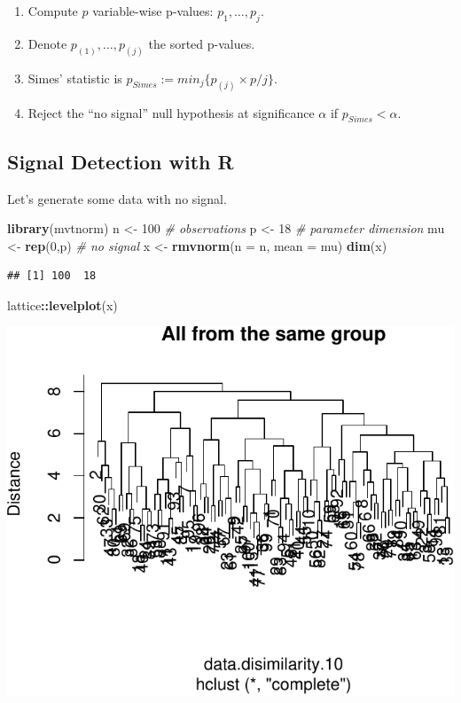 \documentclass[]{book}
\newenvironment{Shaded}{\begin{snugshade}}{\end{snugshade}}
\newcommand{\KeywordTok}[1]{\textcolor[rgb]{0.13,0.29,0.53}{\textbf{#1}}}
\newcommand{\DataTypeTok}[1]{\textcolor[rgb]{0.13,0.29,0.53}{#1}}
\newcommand{\DecValTok}[1]{\textcolor[rgb]{0.00,0.00,0.81}{#1}}
\newcommand{\StringTok}[1]{\textcolor[rgb]{0.31,0.60,0.02}{#1}}
\newcommand{\CommentTok}[1]{\textcolor[rgb]{0.56,0.35,0.01}{\textit{#1}}}
\newcommand{\OperatorTok}[1]{\textcolor[rgb]{0.81,0.36,0.00}{\textbf{#1}}}
\newcommand{\NormalTok}[1]{#1}
\providecommand{\tightlist}{%
  \setlength{\itemsep}{0pt}\setlength{\parskip}{0pt}}
\theoremstyle{definition}
\theoremstyle{definition}
\theoremstyle{definition}
\theoremstyle{remark}
\begin{document}
\begin{enumerate}
\def\labelenumi{\arabic{enumi}.}
\tightlist
\item
  Compute \(p\) variable-wise p-values: \(p_1,\dots,p_j\).
\item
  Denote \(p_{(1)},\dots,p_{(j)}\) the sorted p-values.
\item
  Simes' statistic is \(p_{Simes}:=min_j\{p_{(j)} \times p/j\}\).
\item
  Reject the ``no signal'' null hypothesis at significance \(\alpha\) if
  \(p_{Simes}<\alpha\).
\end{enumerate}

\subsection{Signal Detection with R}\label{signal-detection-with-r}

Let's generate some data with no signal.

\begin{Shaded}
\begin{Highlighting}[]
\KeywordTok{library}\NormalTok{(mvtnorm)}
\NormalTok{n <-}\StringTok{ }\DecValTok{100} \CommentTok{# observations}
\NormalTok{p <-}\StringTok{ }\DecValTok{18} \CommentTok{# parameter dimension}
\NormalTok{mu <-}\StringTok{ }\KeywordTok{rep}\NormalTok{(}\DecValTok{0}\NormalTok{,p) }\CommentTok{# no signal}
\NormalTok{x <-}\StringTok{ }\KeywordTok{rmvnorm}\NormalTok{(}\DataTypeTok{n =}\NormalTok{ n, }\DataTypeTok{mean =}\NormalTok{ mu)}
\KeywordTok{dim}\NormalTok{(x)}
\end{Highlighting}
\end{Shaded}

\begin{verbatim}
## [1] 100  18
\end{verbatim}

\begin{Shaded}
\begin{Highlighting}[]
\NormalTok{lattice}\OperatorTok{::}\KeywordTok{levelplot}\NormalTok{(x)}
\end{Highlighting}
\end{Shaded}

\includegraphics[width=0.5\linewidth]{Rcourse_files/figure-latex/unnamed-chunk-204-1}
\end{document}
